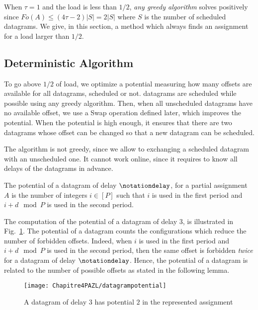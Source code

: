 When $\tau = 1$ and the load is less than $1/2$, \emph{any greedy algorithm} solves \pma positively since $Fo(A) \leq (4\tau -2)|S| = 2|S|$ where $S$ is the number of scheduled datagrams. We give, in this section, a method which always finds an assignment for a load larger than $1/2$.

\subsection{Deterministic Algorithm}

To go above $1/2$ of load, we optimize a potential measuring how many offsets are available for all datagrams, scheduled or not. datagrams are scheduled while possible using any greedy algorithm. Then, when all unscheduled datagrams have no available offset, we use a Swap operation defined later, which improves the potential. When the potential is high enough, it ensures that there are two datagrams whose offset can be changed so that a new datagram can be scheduled. 

The algorithm is not greedy, since we allow to exchanging a scheduled datagram with an unscheduled one. It cannot work online, since it requires to know all delays of the datagrams in advance. 

\begin{definition}
The potential of a datagram of delay $\notationdelay$, for a partial assignment $A$
is the number of integers $i \in [P]$ such that $i$ is used in the first period and $i+d \mod P$ is used in the second period.
\end{definition}

The computation of the potential of a datagram of delay $3$, is illustrated in Fig.~\ref{fig:datagrampotential}.
The potential of a datagram counts the configurations which reduce the number of forbidden offsets.
Indeed, when $i$ is used in the first period and $i+d \mod P$ is used in the second period,
then the same offset is forbidden \emph{twice} for a datagram of delay $\notationdelay$. Hence, the potential of a datagram is related to the number of possible offsets as stated in the following lemma. 
\begin{figure}
 \begin{center}
\texttt{[image: Chapitre4PAZL/datagrampotential]}
\end{center}
\caption{A datagram of delay $3$ has potential $2$ in the represented assignment}
\label{fig:datagrampotential}
\end{figure} 

